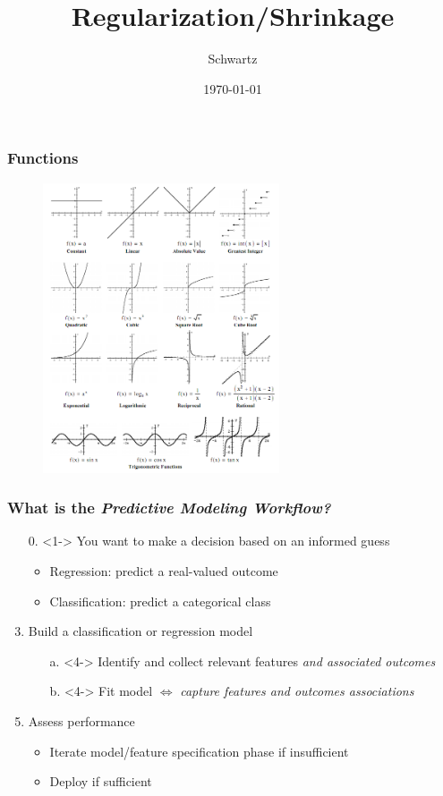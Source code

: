\documentclass[xcolor={dvipsnames}]{beamer}
\title{Regularization/Shrinkage}
\author{Schwartz}
\date{\today}
\begin{document}
\frame{\titlepage}

\frame
{
\frametitle{Functions}

\begin{figure}
\centering
\includegraphics[width=2.75in]{stuff/funcs.png}
\end{figure}
}




\frame
{
\frametitle{What is the \emph{Predictive Modeling Workflow?}}

\begin{enumerate}
\item[0.]<1-> You want to make a decision based on an informed guess 
\begin{itemize}
\item<2-> Regression: predict a real-valued outcome
\item<2-> Classification: predict a categorical class
\end{itemize}
\item[]
\item<3-> Build a classification or regression model 
\begin{itemize}
\item[a.]<4-> Identify and collect relevant features \emph{and associated outcomes} 
\item[b.]<4-> Fit model $\iff$ \emph{capture features and outcomes associations} 
\end{itemize}
\item[]
\item<5-> Assess performance
\begin{itemize}
\item<6-> Iterate model/feature specification phase if insufficient 
\item<6-> Deploy if sufficient
\end{itemize}
\end{enumerate}


${}$\\




}
\end{document}
